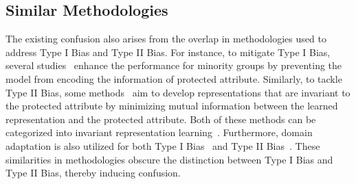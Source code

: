\subsection{Similar Methodologies}
The existing confusion also arises from the overlap in methodologies used to address Type I Bias and Type II Bias.
For instance, to mitigate Type I Bias, several studies~\cite{SensitiveNets,DebFace,pass} enhance the performance for minority groups by preventing the model from encoding the information of protected attribute.
Similarly, to tackle Type II Bias, some methods~\cite{Back_MI,CSAD,learn_not_to_learn_Colored_MNIST} aim to develop representations that are invariant to the protected attribute by minimizing mutual information between the learned representation and the protected attribute.
Both of these methods can be categorized into invariant representation learning~\cite{IRM}.
Furthermore, domain adaptation is also utilized for both Type I Bias~\cite{BAE,MFR} and Type II Bias~\cite{DARE}.
These similarities in methodologies obscure the distinction between Type I Bias and Type II Bias, thereby inducing confusion.


